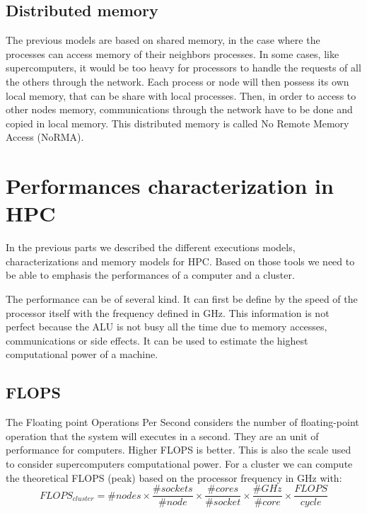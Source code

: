 \subsection{Distributed memory}
The previous models are based on shared memory, in the case where the processes can access memory of their neighbors processes. 
In some cases, like supercomputers, it would be too heavy for processors to handle the requests of all the others through the network. 
Each process or node will then possess its own local memory, that can be share with local processes. 
Then, in order to access to other nodes memory, communications through the network have to be done and copied in local memory. 
This distributed memory is called No Remote Memory Access (NoRMA).

\section{Performances characterization in HPC}
In the previous parts we described the different executions models, characterizations and memory models for HPC. 
Based on those tools we need to be able to emphasis the performances of a computer and a cluster. 

The performance can be of several kind. 
It can first be define by the speed of the processor itself with the frequency defined in GHz. 
This information is not perfect because the ALU is not busy all the time due to memory accesses, communications or side effects. 
It can be used to estimate the highest computational power of a machine. 

\subsection{FLOPS}

The Floating point Operations Per Second considers the number of floating-point operation that the system will executes in a second. 
They are an unit of performance for computers. 
Higher FLOPS is better. 
This is also the scale used to consider supercomputers computational power. 
For a cluster we can compute the theoretical FLOPS (peak) based on the processor frequency in GHz with:
\begin{equation}
FLOPS_{cluster} = \#nodes \times \frac{\#sockets}{\#node} \times \frac{\#cores}{\#socket} \times \frac{\#GHz}{\#core} \times \frac{FLOPS}{cycle}
\end{equation}

